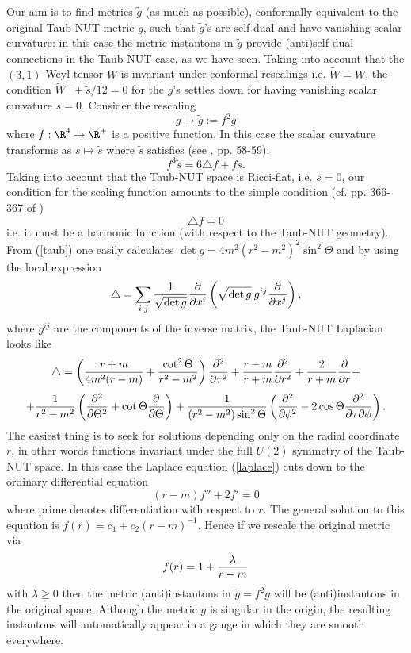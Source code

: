 \documentclass[a4paper,12pt,draft]{article}
\begin{document}
Our aim is to find metrics $\tilde{g}$ (as much as
possible), conformally equivalent to the original Taub-NUT metric $g$,
such that $\tilde{g}$'s are self-dual and have vanishing scalar curvature: 
in this case the metric instantons in $\tilde{g}$ provide (anti)self-dual
connections in the Taub-NUT case, as we have seen. Taking
into account that the $(3,1)$-Weyl tensor $W$ is invariant under
conformal rescalings i.e. $\widetilde{W}=W$, the condition
$\widetilde{W}^-+\tilde{s}/12 =0$ for the $\tilde{g}$'s settles down for
having vanishing scalar curvature $\tilde{s}=0$. Consider the rescaling
\[g\longmapsto\tilde{g}:=f^2g\]
where $f: \R^4\rightarrow\R^+$ is a positive function. In this case
the scalar curvature transforms as $s\mapsto\tilde{s}$ where $\tilde{s}$
satisfies (see \cite{bes}, pp. 58-59):
\[f^3\tilde{s}=6\triangle f +fs.\]
Taking into account that the Taub-NUT space is Ricci-flat, i.e. $s=0$, our
condition for the scaling function amounts to the simple condition
(cf. pp. 366-367 of \cite{boo-ble})
\begin{equation}
\triangle f =0
\label{laplace}
\end{equation}
i.e. it must be a harmonic function (with respect to the Taub-NUT
geometry). From (\ref{taub}) one easily calculates $\det
g=4m^2(r^2-m^2)^2\sin^2\Theta$ and by using the local expression
\[\triangle =\sum\limits_{i,j}{1\over\sqrt{\det g}}{\partial\over\partial
x^i}\left(\sqrt{\det g}\:g^{ij}{\partial\over\partial x^j}\right) ,\]
where $g^{ij}$ are the components of the inverse matrix, the Taub-NUT
Laplacian looks like
\[\triangle
=\left( {r+m\over 4m^2(r-m)}+{\cot^2\Theta\over r^2-m^2}\right)
{\partial^2\over\partial\tau^2}+{r-m\over
r+m}{\partial^2\over\partial r^2}+{2\over r+m}{\partial\over\partial
r}+\]
\[+{1\over
r^2-m^2}\left({\partial^2\over\partial\Theta^2}+\cot\Theta{\partial\over
\partial\Theta}\right) +{1\over 
(r^2-m^2)\sin^2\Theta}\left({\partial^2\over\partial\phi^2}-2\cos\Theta
{\partial^2\over\partial\tau\partial\phi}\right) .\]
The easiest thing is to seek for solutions depending only on the radial
coordinate $r$, in other words functions invariant under the full $U(2)$
symmetry of the Taub-NUT space. In this case the Laplace equation
(\ref{laplace}) cuts down to the ordinary differential equation
\[(r-m)f''+2f'=0\]
where prime denotes differentiation with respect to $r$. The general
solution to this equation is $f(r)=c_1+c_2(r-m)^{-1}$. Hence if we rescale
the original metric via 
\begin{equation}
f(r)=1+{\lambda\over r-m}
\label{skala}
\end{equation}
with $\lambda\geq 0$ then the metric (anti)instantons in $\tilde{g}=f^2g$
will be (anti)instantons in the original space. Although the metric
$\tilde{g}$ is singular in the origin, the resulting instantons will 
automatically appear in a gauge in which they are smooth everywhere.
\end{document}
